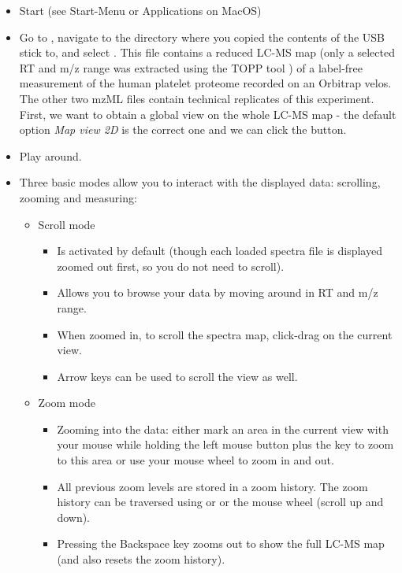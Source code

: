 \begin{itemize}
\item Start  (see Start-Menu or Applications on MacOS)
\item Go to , navigate to the directory where you copied the contents of the USB stick to,
      and select
      . This file contains a reduced LC-MS map (only a selected RT and m/z range
      was extracted using the TOPP tool ) of a label-free measurement of the human platelet proteome recorded on an Orbitrap velos.
      The other two mzML files contain technical replicates of this experiment.
      First, we want to obtain a global view on the whole LC-MS map - the default option \textit{Map view 2D} is the correct one and we can click the  button. 
\item Play around.
\item Three basic modes allow you to interact with the displayed data: scrolling, zooming and measuring:
    \begin{itemize}
    \item Scroll mode
        \begin{itemize}
        \item Is activated by default (though each loaded spectra file is displayed zoomed out first, so you do not need to scroll).
        \item Allows you to browse your data by moving around in RT and m/z range.
        \item When zoomed in, to scroll the spectra map, click-drag on the current view.
        \item Arrow keys can be used to scroll the view as well.
        \end{itemize}
    \item Zoom mode
        \begin{itemize}
        \item Zooming into the data: either mark an area in the current view with your mouse while holding the left mouse
              button plus the \keys{\ctrl} key to zoom to this area
              or use your mouse wheel to zoom in and out.
        \item All previous zoom levels are stored in a zoom history. The zoom history can be traversed using
              \keys[,]{\ctrl,+} or \keys[,]{\ctrl,-} or the mouse wheel (scroll up and down).
        \item Pressing the Backspace key zooms out to show the full LC-MS map (and also resets the zoom history).

\end{itemize}
\end{itemize}
\end{itemize}
